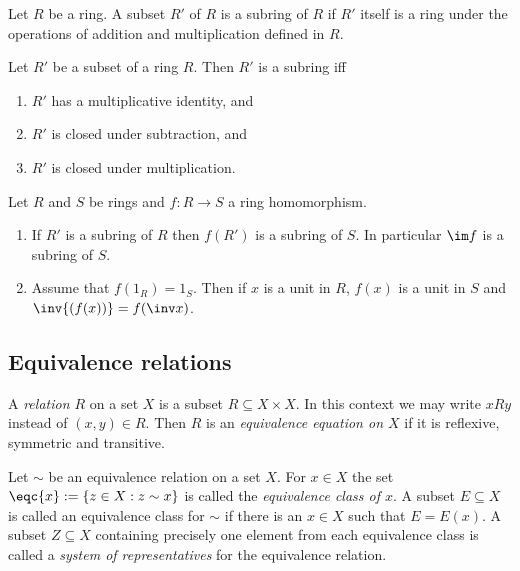 \documentclass{article}
\begin{document}
\begin{definition}
	Let $R$ be a ring. A subset $R'$ of $R$ is a subring of $R$ if $R'$ itself
	is a ring under the operations of addition and multiplication defined in $R$.
\end{definition}

\begin{proposition}[Notes 3.4.26]
	Let $R'$ be a subset of a ring $R$. Then $R'$ is a subring iff
	\begin{enumerate}
		\item $R'$ has a multiplicative identity, and
		\item $R'$ is closed under subtraction, and
		\item $R'$ is closed under multiplication.
	\end{enumerate}
\end{proposition}

\begin{proposition}[Notes 3.4.28]
	Let $R$ and $S$ be rings and $f:R\to S$ a ring homomorphism.
	\begin{enumerate}
		\item If $R'$ is a subring of $R$ then $f(R')$ is a subring of $S$. In particular
		      $\im f$ is a subring of $S$.
		\item Assume that $f(1_R)=1_S$. Then if $x$ is a unit in $R$, $f(x)$ is a unit
		      in $S$ and $\inv{(f(x))} = f(\inv x)$.
	\end{enumerate}
\end{proposition}

\subsection{Equivalence relations}

\begin{definition}
	A \emph{relation $R$} on a set $X$ is a subset $R\subseteq X\times X$. In this context we
	may write $xRy$ instead of $(x,y)\in R$. Then $R$ is an \emph{equivalence equation on $X$}
	if it is reflexive, symmetric and transitive.
\end{definition}
\begin{definition}
	Let $\sim$ be an equivalence relation on a set $X$. For $x\in X$ the set $\eqc{x}:=\{z\in X:z\sim x\}$
	is called the \emph{equivalence class of $x$}. A subset $E\subseteq X$ is called an equivalence
	class for $\sim$ if there is an $x\in X$ such that $E=E(x)$. A subset $Z\subseteq X$ containing
	precisely one element from each equivalence class is called a \emph{system of representatives}
	for the equivalence relation.
\end{definition}
\end{document}
